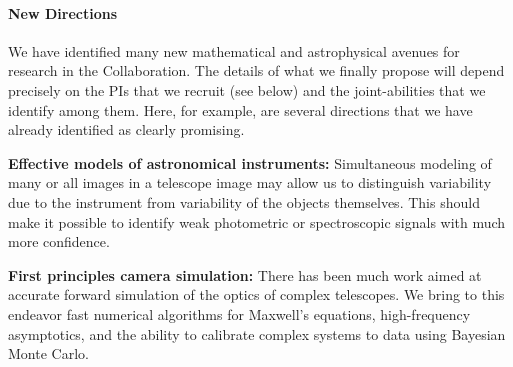 \documentclass[12pt]{article}
\begin{document}
\paragraph{New Directions}

We have identified many new mathematical and astrophysical avenues for
research in the Collaboration.
The details of what we finally propose will depend precisely on the
PIs that we recruit (see below) and the joint-abilities that we
identify among them.
Here, for example, are several directions that we have already
identified as clearly promising.


\textbf{Effective models of astronomical instruments:}
Simultaneous modeling of many or all images in a telescope image 
may allow us to distinguish variability due to the instrument from
variability of the objects themselves.  
This should make it possible to identify weak photometric or spectroscopic
signals with much more confidence.

\textbf{First principles camera simulation:} 
There has been much work aimed at accurate forward simulation of the optics 
of complex telescopes.
We bring to this endeavor fast numerical algorithms for Maxwell's equations,
high-frequency asymptotics, and the ability to calibrate complex systems 
to data using Bayesian Monte Carlo.


\end{document}
